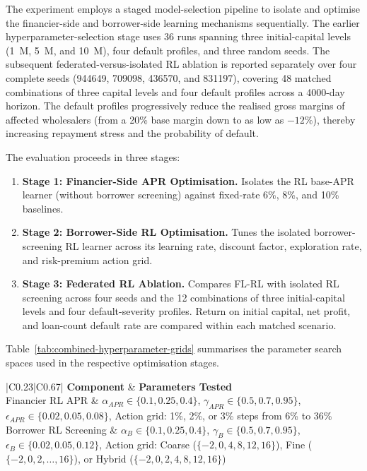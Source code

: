 \documentclass[12pt]{article}
\begin{document}
	The experiment employs a staged model-selection pipeline to isolate and optimise the financier-side and borrower-side learning mechanisms sequentially. The earlier hyperparameter-selection stage uses 36 runs spanning three initial-capital levels (1~M, 5~M, and 10~M), four default profiles, and three random seeds. The subsequent federated-versus-isolated RL ablation is reported separately over four complete seeds (944649, 709098, 436570, and 831197), covering 48 matched combinations of three capital levels and four default profiles across a 4000-day horizon. The default profiles progressively reduce the realised gross margins of affected wholesalers (from a 20\% base margin down to as low as \(-12\%\)), thereby increasing repayment stress and the probability of default.
	
	The evaluation proceeds in three stages:
	\begin{enumerate}
		\item \textbf{Stage 1: Financier-Side APR Optimisation.} Isolates the RL base-APR learner (without borrower screening) against fixed-rate 6\%, 8\%, and 10\% baselines. 
		\item \textbf{Stage 2: Borrower-Side RL Optimisation.} Tunes the isolated borrower-screening RL learner across its learning rate, discount factor, exploration rate, and risk-premium action grid.
		\item \textbf{Stage 3: Federated RL Ablation.} Compares FL-RL with isolated RL screening across four seeds and the 12 combinations of three initial-capital levels and four default-severity profiles. Return on initial capital, net profit, and loan-count default rate are compared within each matched scenario.
	\end{enumerate}
	
	Table~\ref{tab:combined-hyperparameter-grids} summarises the parameter search spaces used in the respective optimisation stages.
	
	\begin{table}[h]
		\centering
		\caption{Hyperparameter optimisation grids for the RL components}
		\label{tab:combined-hyperparameter-grids}
		\begin{tabular}{|C{0.23\linewidth}|C{0.67\linewidth}|}
			\hline
			\textbf{Component} & \textbf{Parameters Tested} \\
			\hline
			Financier RL APR & \(\alpha_{APR} \in \{0.1, 0.25, 0.4\}\), \(\gamma_{APR} \in \{0.5, 0.7, 0.95\}\), \(\epsilon_{APR} \in \{0.02, 0.05, 0.08\}\), \newline Action grid: 1\%, 2\%, or 3\% steps from 6\% to 36\% \\
			\hline
			Borrower RL Screening & \(\alpha_{B} \in \{0.1, 0.25, 0.4\}\), \(\gamma_{B} \in \{0.5, 0.7, 0.95\}\), \(\epsilon_{B} \in \{0.02, 0.05, 0.12\}\), \newline Action grid: Coarse ($\{-2, 0, 4, 8, 12, 16\}$), Fine ($\{-2, 0, 2, \dots, 16\}$), or Hybrid ($\{-2, 0, 2, 4, 8, 12, 16\}$) \\
			\hline
		\end{tabular}
	\end{table}
\end{document}
